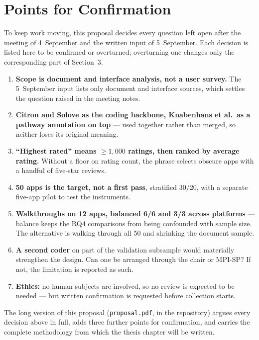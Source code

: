 \documentclass[10pt,a4paper]{article}
\begin{document}
\section{Points for Confirmation}

To keep work moving, this proposal decides every question left open after the
meeting of 4~September and the written input of 5~September. Each decision is
listed here to be confirmed or overturned; overturning one changes only the
corresponding part of Section~3.

\begin{enumerate}[itemsep=1pt,topsep=2pt]
  \item \textbf{Scope is document and interface analysis, not a user survey.}
    The 5~September input lists only document and interface sources, which
    settles the question raised in the meeting notes.
  \item \textbf{Citron and Solove as the coding backbone, Knabenhans et al.\ as
    a pathway annotation on top} --- used together rather than merged, so
    neither loses its original meaning.
  \item \textbf{\enquote{Highest rated} means $\geq 1{,}000$ ratings, then
    ranked by average rating.} Without a floor on rating count, the phrase
    selects obscure apps with a handful of five-star reviews.
  \item \textbf{50 apps is the target, not a first pass}, stratified 30/20, with
    a separate five-app pilot to test the instruments.
  \item \textbf{Walkthroughs on 12 apps, balanced 6/6 and 3/3 across platforms}
    --- balance keeps the RQ4 comparisons from being confounded with sample
    size. The alternative is walking through all 50 and shrinking the document
    sample.
  \item \textbf{A second coder} on part of the validation subsample would
    materially strengthen the design. Can one be arranged through the chair or
    MPI-SP? If not, the limitation is reported as such.
  \item \textbf{Ethics:} no human subjects are involved, so no review is
    expected to be needed --- but written confirmation is requested before
    collection starts.
\end{enumerate}

\medskip
\noindent\footnotesize
The long version of this proposal (\texttt{proposal.pdf}, in the repository)
argues every decision above in full, adds three further points for confirmation,
and carries the complete methodology from which the thesis chapter will be
written.

\printbibliography[title={References}]
\end{document}
